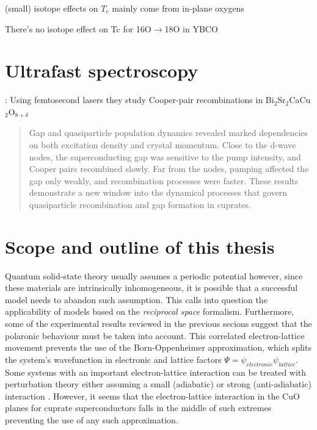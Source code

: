 (small) isotope effects on $T_c$ mainly come from in-plane oxygens \cite{Zech1994}

There's no isotope effect on Tc for 16O$\rightarrow$18O in YBCO \cite{Thomsen1988}

\section{Ultrafast spectroscopy}
\label{sec:ultrafast_spect}

\cite{Smallwood2012}: Using femtosecond lasers they study Cooper-pair recombinations in Bi$_2$Sr$_2$CaCu$_2$O$_{8+\delta}$
\begin{quote}Gap and quasiparticle population dynamics revealed marked dependencies on both excitation density and crystal momentum. Close to the d-wave nodes, the superconducting gap was sensitive to the pump intensity, and Cooper pairs recombined slowly. Far from the nodes, pumping affected the gap only weakly, and recombination processes were faster. These results demonstrate a new window into the dynamical processes that govern quasiparticle recombination and gap formation in cuprates.\end{quote}

\section{Scope and outline of this thesis}
\label{sec:scope}



Quantum solid-state theory usually assumes a periodic potential however, since these materials are intrinsically inhomogeneous, it is possible that a successful model needs to abandon such assumption. 
This calls into question the applicability of models based on the \textit{reciprocal space} formalism.
Furthermore, some of the experimental results reviewed in the previous secions suggest that the polaronic behaviour must be taken into account.
This correlated electron-lattice movement prevents the use of the Born-Oppenheimer approximation, which splits the system's wavefunction in electronic and lattice factors $\Psi = \psi_{electronic}\psi_{lattice}$.
Some systems with an important electron-lattice interaction can be treated with perturbation theory either assuming a small (adiabatic) or strong (anti-adiabatic) interaction \cite{?}. 
However, it seems that the electron-lattice interaction in the CuO planes for cuprate superconductors falls in the middle of such extremes \cite{MustredeLeon1992} preventing the use of any such approximation.

